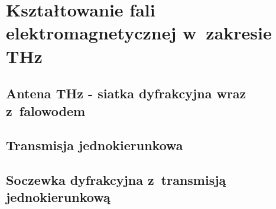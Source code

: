 \chapter{Kształtowanie fali elektromagnetycznej w~zakresie THz }
\label{chap:thz}


\section{Antena THz - siatka dyfrakcyjna wraz z~falowodem}


\section{Transmisja jednokierunkowa}

\section{Soczewka dyfrakcyjna z~transmisją jednokierunkową}

